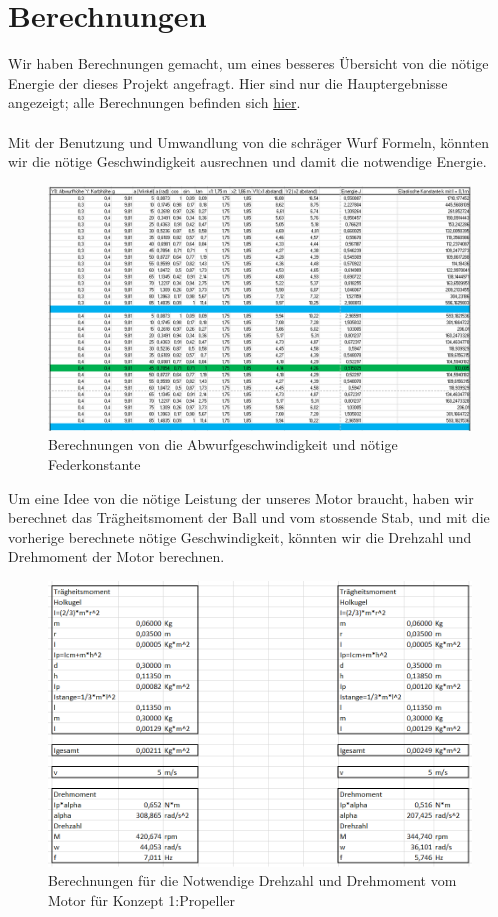\section{Berechnungen}
Wir haben Berechnungen gemacht, um eines besseres Übersicht von die nötige Energie der dieses Projekt angefragt.
Hier sind nur die Hauptergebnisse angezeigt; alle Berechnungen befinden sich \href{https://github.com/accefa/doku/tree/master/bin/Berechnungen.xlsx}{hier}. \\ \\
Mit der Benutzung und Umwandlung von die schräger Wurf Formeln, könnten wir die nötige Geschwindigkeit ausrechnen und damit die notwendige Energie.
\begin{figure}[h!]
	\centering
	\includegraphics[width=1\textwidth]{../../fig/Geschwindigkeit_und_eleastische_Konstante.png}
	\caption{Berechnungen von die Abwurfgeschwindigkeit und nötige Federkonstante}
	\label{fig:Berechnungen von die Geschwindigkeit}
\end{figure}
\newpage
Um eine Idee von die nötige Leistung der unseres Motor braucht, haben wir berechnet das Trägheitsmoment der Ball und vom stossende Stab, und mit die vorherige berechnete nötige Geschwindigkeit, könnten wir die Drehzahl und Drehmoment der Motor berechnen.
\begin{figure}[h!]
	\centering
	\includegraphics[width=1\textwidth]{../../fig/Berechnungen_Propeller.png}
	\caption{Berechnungen für die Notwendige Drehzahl und Drehmoment vom Motor für Konzept 1:Propeller}
	\label{fig:Berechnungen für der Propellerkonzept}
\end{figure}
